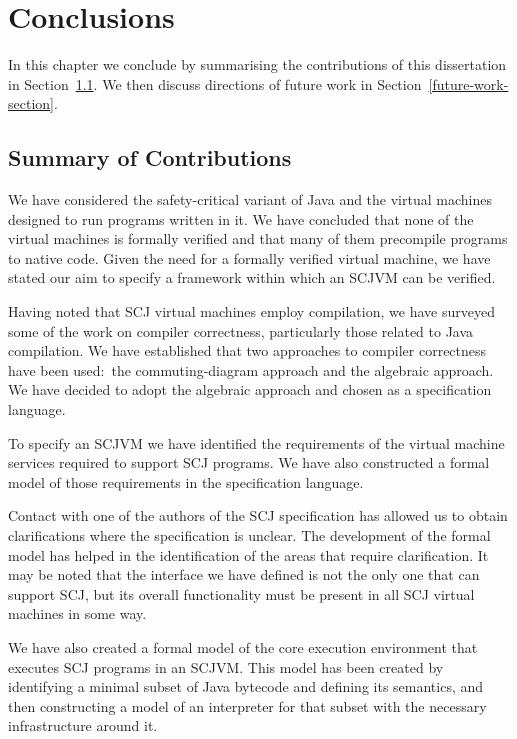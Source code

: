 \chapter{Conclusions}
\label{conclusions-chapter}
In this chapter we conclude by summarising the contributions of this
dissertation in Section~\ref{summary-section}.
We then discuss directions of future work in
Section~\ref{future-work-section}.

\section{Summary of Contributions}
\label{summary-section}

We have considered the safety-critical variant of Java and the virtual
machines designed to run programs written in it.
We have concluded that none of the virtual machines is formally
verified and that many of them precompile programs to native code.
Given the need for a formally verified virtual machine, we have stated
our aim to specify a framework within which an SCJVM can
be verified.

Having noted that SCJ virtual machines employ compilation, we have
surveyed some of the work on compiler correctness, particularly those
related to Java compilation.
We have established that two approaches to compiler correctness have
been used:~the commuting-diagram approach and the algebraic approach.
We have decided to adopt the algebraic approach and chosen \Circus{}
as a specification language.

To specify an SCJVM we have identified the requirements
of the virtual machine services required to support SCJ programs.
We have also constructed a formal model of those requirements in the
\Circus{} specification language.

Contact with one of the authors of the SCJ specification has allowed
us to obtain clarifications where the specification is unclear.
The development of the formal model has helped in the
identification of the areas that require clarification.
It may be noted that the interface we have defined is not the only one
that can support SCJ, but its overall functionality
must be present in all SCJ virtual machines in some way.

We have also created a formal model of the core execution environment
that executes SCJ programs in an SCJVM.
This model has been created by identifying a minimal subset of Java
bytecode and defining its semantics, and then constructing a \Circus{}
model of an interpreter for that subset with the necessary
infrastructure around it.

